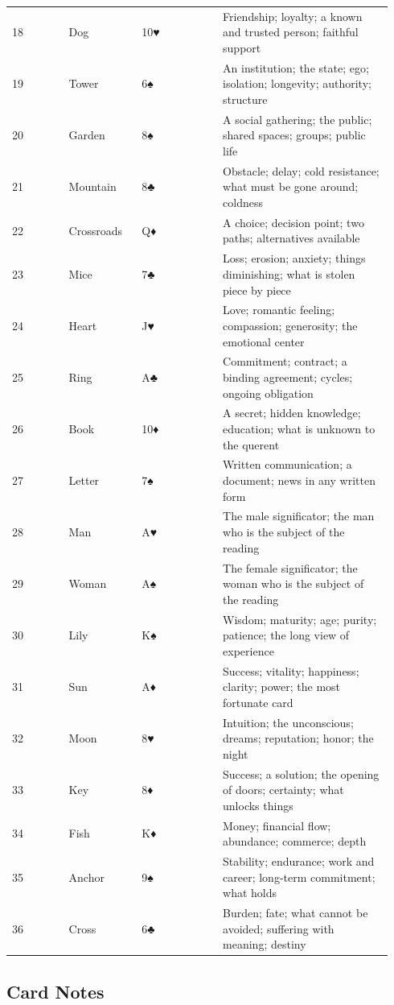 \begin{longtable}[]{@{}>{\RaggedRight\small}p{0.14\linewidth}>{\RaggedRight\small}p{0.18\linewidth}>{\RaggedRight\small}p{0.20\linewidth}>{\RaggedRight\small}p{0.42\linewidth}@{}}
18 & Dog & 10♥ & Friendship; loyalty; a known and trusted person; faithful support \\
19 & Tower & 6♠ & An institution; the state; ego; isolation; longevity; authority; structure \\
20 & Garden & 8♠ & A social gathering; the public; shared spaces; groups; public life \\
21 & Mountain & 8♣ & Obstacle; delay; cold resistance; what must be gone around; coldness \\
22 & Crossroads & Q♦ & A choice; decision point; two paths; alternatives available \\
23 & Mice & 7♣ & Loss; erosion; anxiety; things diminishing; what is stolen piece by piece \\
24 & Heart & J♥ & Love; romantic feeling; compassion; generosity; the emotional center \\
25 & Ring & A♣ & Commitment; contract; a binding agreement; cycles; ongoing obligation \\
26 & Book & 10♦ & A secret; hidden knowledge; education; what is unknown to the querent \\
27 & Letter & 7♠ & Written communication; a document; news in any written form \\
28 & Man & A♥ & The male significator; the man who is the subject of the reading \\
29 & Woman & A♠ & The female significator; the woman who is the subject of the reading \\
30 & Lily & K♠ & Wisdom; maturity; age; purity; patience; the long view of experience \\
31 & Sun & A♦ & Success; vitality; happiness; clarity; power; the most fortunate card \\
32 & Moon & 8♥ & Intuition; the unconscious; dreams; reputation; honor; the night \\
33 & Key & 8♦ & Success; a solution; the opening of doors; certainty; what unlocks things \\
34 & Fish & K♦ & Money; financial flow; abundance; commerce; depth \\
35 & Anchor & 9♠ & Stability; endurance; work and career; long-term commitment; what holds \\
36 & Cross & 6♣ & Burden; fate; what cannot be avoided; suffering with meaning; destiny \\
\end{longtable}

\subsection{Card Notes}\label{card-notes}

